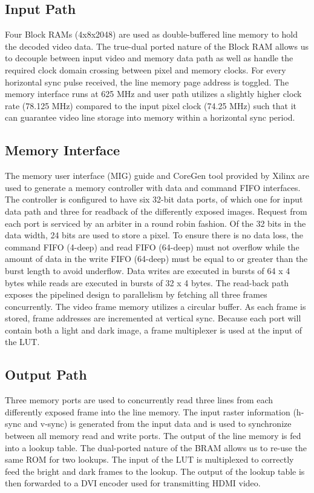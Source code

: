 \subsection{Input Path}
Four Block RAMs (4x8x2048) are used as double-buffered
line memory to hold the decoded video data.  The true-dual ported
nature of the Block RAM allows us to decouple between input video and
memory data path as well as handle the required clock domain crossing
between pixel and memory clocks.  For every horizontal sync pulse
received, the line memory page address is toggled.  The memory
interface runs at 625 MHz and user path utilizes a slightly higher
clock rate (78.125 MHz) compared to the input pixel clock (74.25 MHz)
such that it can guarantee video line storage into memory within a
horizontal sync period.  

\subsection{Memory Interface}
The memory user interface (MIG) guide and CoreGen tool
provided by Xilinx are used to generate a memory controller with data
and command FIFO interfaces. The controller is configured to have six
32-bit data ports, of which one for input data path and three for
readback of the differently exposed images. Request from each port is
serviced by an arbiter in a round robin fashion. Of the 32 bits in the data
width, 24 bits are used to store a pixel. To ensure there is no data loss,
the command FIFO (4-deep) and read FIFO (64-deep) must not overflow
while the amount of data in the write FIFO (64-deep) must be equal to
or greater than the burst length to avoid underflow. Data writes are
executed in bursts of 64 x 4 bytes while reads are executed in bursts of 32 x
4 bytes. The read-back path exposes the pipelined design to parallelism
by fetching all three frames concurrently. The video frame memory
utilizes a circular buffer. As each frame is stored, frame addresses
are incremented at vertical sync.  Because each port will contain both
a light and dark image, a frame multiplexer is used at the input of
the LUT.


\subsection{Output Path}
Three memory ports are used to concurrently read three
lines from each differently exposed frame into the line memory. The
input raster information (h-sync and v-sync) is generated from the input
data and is used to synchronize between all memory read and write
ports. The output of the line memory is fed into a lookup table. The
dual-ported nature of the BRAM allows us to re-use the same ROM for
two lookups. The input of the LUT is multiplexed to correctly feed the
bright and dark frames to the lookup. The output of the lookup table
is then forwarded to a DVI encoder used for transmitting HDMI video.

